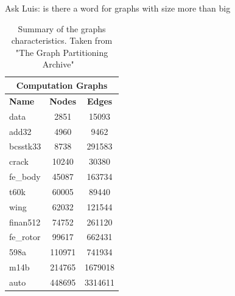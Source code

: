 Ask Luis: is there a word for graphs with size more than big

\begin{table}[h!]
\centering
\begin{tabular}{ |p{1.75cm}||cc|  }
\hline
\multicolumn{3}{|c|}{\textbf{Computation Graphs}} \\
\hline
\hline
\textbf{Name} & \textbf{Nodes} & \textbf{Edges} \\
\hline
data & 2851 & 15093  \\
add32 & 4960 & 9462  \\
bcsstk33 & 8738 & 291583  \\
crack & 10240 & 30380  \\
\hline
fe\_body & 45087 & 163734  \\
t60k & 60005 & 89440  \\
wing & 62032 & 121544  \\
finan512 & 74752 & 261120 \\
\hline
fe\_rotor & 99617 & 662431  \\
598a & 110971 & 741934  \\
m14b & 214765 & 1679018	 \\
auto & 448695 & 3314611  \\
\hline
\end{tabular}
\caption{\label{tab:characteristics}Summary of the graphs characteristics. Taken from "The Graph Partitioning Archive" ~\cite{archive}}
\end{table}


